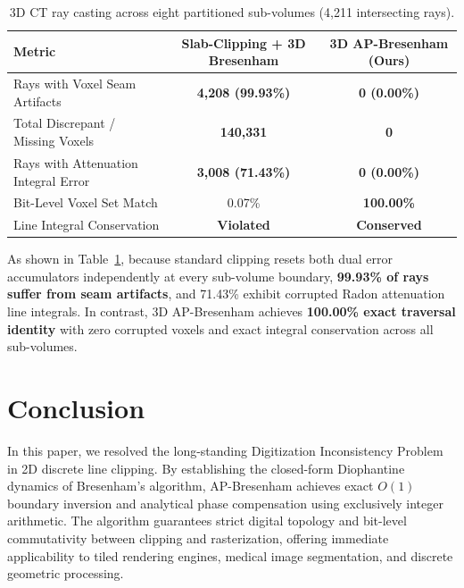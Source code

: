 \documentclass[runningheads]{llncs}
\begin{document}
\begin{table}[h]
\centering
\caption{3D CT ray casting across eight partitioned sub-volumes (4,211 intersecting rays).}
\label{tab:results_3d}
\begin{tabular}{lcc}
\toprule
\textbf{Metric} & \textbf{Slab-Clipping + 3D Bresenham} & \textbf{3D AP-Bresenham (Ours)} \\
\midrule
Rays with Voxel Seam Artifacts & \textbf{4,208 (99.93\%)} & \textbf{0 (0.00\%)} \\
Total Discrepant / Missing Voxels & \textbf{140,331} & \textbf{0} \\
Rays with Attenuation Integral Error & \textbf{3,008 (71.43\%)} & \textbf{0 (0.00\%)} \\
Bit-Level Voxel Set Match & 0.07\% & \textbf{100.00\%} \\
Line Integral Conservation & \textbf{Violated} & \textbf{Conserved} \\
\bottomrule
\end{tabular}
\end{table}

As shown in Table~\ref{tab:results_3d}, because standard clipping resets both dual error accumulators independently at every sub-volume boundary, \textbf{99.93\% of rays suffer from seam artifacts}, and 71.43\% exhibit corrupted Radon attenuation line integrals. In contrast, 3D AP-Bresenham achieves \textbf{100.00\% exact traversal identity} with zero corrupted voxels and exact integral conservation across all sub-volumes.

\section{Conclusion}
\label{sec:conclusion}

In this paper, we resolved the long-standing Digitization Inconsistency Problem in 2D discrete line clipping. By establishing the closed-form Diophantine dynamics of Bresenham's algorithm, AP-Bresenham achieves exact $O(1)$ boundary inversion and analytical phase compensation using exclusively integer arithmetic. The algorithm guarantees strict digital topology and bit-level commutativity between clipping and rasterization, offering immediate applicability to tiled rendering engines, medical image segmentation, and discrete geometric processing.

%
%


\end{document}
